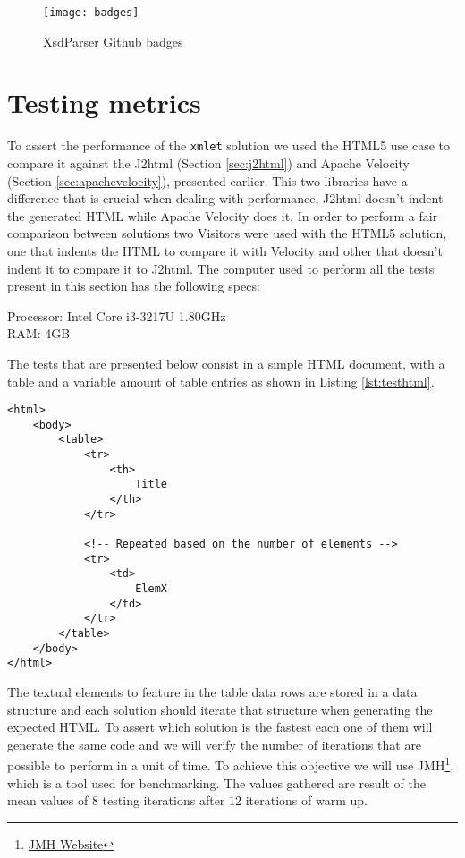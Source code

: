 \begin{figure}[h]
	\centering
	\texttt{[image: badges]}
	\caption{XsdParser Github badges}
	\label{project_badges}
\end{figure}

\section{Testing metrics} %
\label{sec:testingmetrics}

To assert the performance of the \texttt{xmlet} solution we used the \ac{HTML}5 use case to compare it against the J2html (Section \ref{sec:j2html}) and Apache Velocity (Section \ref{sec:apachevelocity}), presented earlier. This two libraries have a difference that is crucial when dealing with performance, J2html doesn't indent the generated \ac{HTML} while Apache Velocity does it. In order to perform a fair comparison between solutions two Visitors were used with the \ac{HTML}5 solution, one that indents the \ac{HTML} to compare it with Velocity and other that doesn't indent it to compare it to J2html. The computer used to perform all the tests present in this section has the following specs:

Processor: Intel Core i3-3217U 1.80GHz\\
RAM: 4GB

\noindent
The tests that are presented below consist in a simple \ac{HTML} document, with a table and a variable amount of table entries as shown in Listing \ref{lst:testhtml}. 

\lstset{language=html}

\begin{minipage}{\linewidth}
\begin{lstlisting}[caption={Test HTML}, label={lst:testhtml}]
<html>
    <body>
        <table>
            <tr>
                <th>
                    Title
                </th>
            </tr>
            
            <!-- Repeated based on the number of elements -->
            <tr>
                <td>
                    ElemX
                </td>
            </tr>
        </table>
    </body>
</html>
\end{lstlisting}
\end{minipage}

The textual elements to feature in the table data rows are stored in a data structure and each solution should iterate that structure when generating the expected \ac{HTML}. To assert which solution is the fastest each one of them will generate the same code and we will verify the number of iterations that are possible to perform in a unit of time. To achieve this objective we will use \ac{JMH}\footnote{\href{http://openjdk.java.net/projects/code-tools/jmh/}{JMH Website}}, which is a tool used for benchmarking. The values gathered are result of the mean values of 8 testing iterations after 12 iterations of warm up. 


